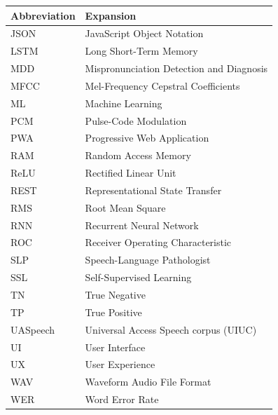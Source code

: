 \clearpage

\begin{center}
\begin{tabular}{@{}p{3.2cm}p{10.0cm}@{}}
\toprule
\textbf{Abbreviation} & \textbf{Expansion} \\
\midrule
JSON     & JavaScript Object Notation \\
LSTM     & Long Short-Term Memory \\
MDD      & Mispronunciation Detection and Diagnosis \\
MFCC     & Mel-Frequency Cepstral Coefficients \\
ML       & Machine Learning \\
PCM      & Pulse-Code Modulation \\
PWA      & Progressive Web Application \\
RAM      & Random Access Memory \\
ReLU     & Rectified Linear Unit \\
REST     & Representational State Transfer \\
RMS      & Root Mean Square \\
RNN      & Recurrent Neural Network \\
ROC      & Receiver Operating Characteristic \\
SLP      & Speech-Language Pathologist \\
SSL      & Self-Supervised Learning \\
TN       & True Negative \\
TP       & True Positive \\
UASpeech & Universal Access Speech corpus (UIUC) \\
UI       & User Interface \\
UX       & User Experience \\
WAV      & Waveform Audio File Format \\
WER      & Word Error Rate \\
\bottomrule
\end{tabular}
\end{center}

\clearpage
